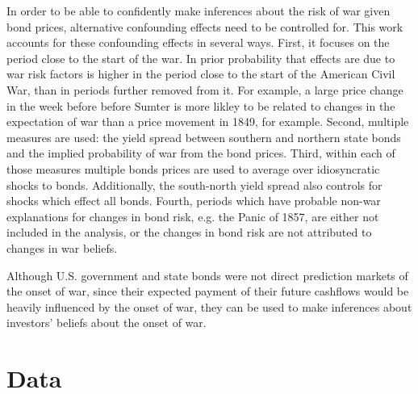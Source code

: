 \documentclass[11pt, oneside, article]{memoir}\usepackage[]{graphicx}\usepackage[]{color}
\begin{document}
In order to be able to confidently make inferences about the risk of war given bond prices, alternative confounding effects need to be controlled for.
This work accounts for these confounding effects in several ways.
First, it focuses on the period close to the start of the war.
In prior probability that effects are due to war risk factors is higher in the period close to the start of the American Civil War, than in periods further removed from it.
For example, a large price change in the week before before Sumter is more likley to be related to changes in the expectation of war than a price movement in 1849, for example.
Second, multiple measures are used: the yield spread between southern and northern state bonds and the implied probability of war from the bond prices.
Third, within each of those measures multiple bonds prices are used to average over idiosyncratic shocks to bonds.
Additionally, the south-north yield spread also controls for shocks which effect all bonds.
Fourth, periods which have probable non-war explanations for changes in bond risk, e.g. the Panic of 1857, are either not included in the analysis, or the changes in bond risk are not attributed to changes in war beliefs.

Although U.S. government and state bonds were not direct prediction markets of the onset of war, since their expected payment of their future cashflows would be heavily influenced by the onset of war, they can be used to make inferences about investors' beliefs about the onset of war.

\section{Data}
\label{sec:data}
\end{document}

